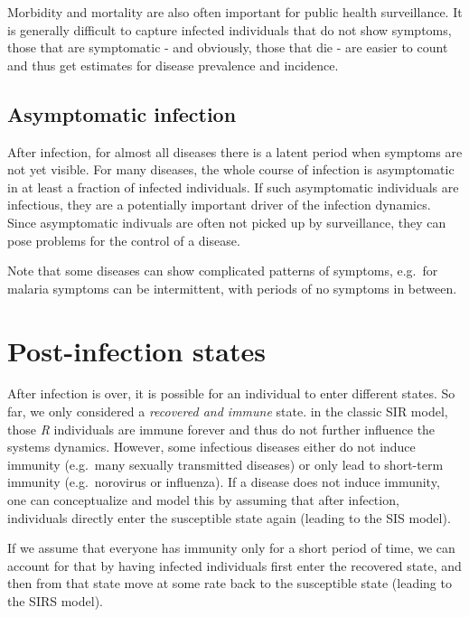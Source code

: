 \documentclass[]{book}
\theoremstyle{definition}
\theoremstyle{definition}
\theoremstyle{definition}
\theoremstyle{remark}
\begin{document}
Morbidity and mortality are also often important for public health
surveillance. It is generally difficult to capture infected individuals
that do not show symptoms, those that are symptomatic - and obviously,
those that die - are easier to count and thus get estimates for disease
prevalence and incidence.

\hypertarget{asymptomatic-infection}{%
\subsection{Asymptomatic infection}\label{asymptomatic-infection}}

After infection, for almost all diseases there is a latent period when
symptoms are not yet visible. For many diseases, the whole course of
infection is asymptomatic in at least a fraction of infected
individuals. If such asymptomatic individuals are infectious, they are a
potentially important driver of the infection dynamics. Since
asymptomatic indivuals are often not picked up by surveillance, they can
pose problems for the control of a disease.

Note that some diseases can show complicated patterns of symptoms,
e.g.~for malaria symptoms can be intermittent, with periods of no
symptoms in between.

\hypertarget{post-infection-states}{%
\section{Post-infection states}\label{post-infection-states}}

After infection is over, it is possible for an individual to enter
different states. So far, we only considered a \emph{recovered and
immune} state. in the classic SIR model, those \emph{R} individuals are
immune forever and thus do not further influence the systems dynamics.
However, some infectious diseases either do not induce immunity
(e.g.~many sexually transmitted diseases) or only lead to short-term
immunity (e.g.~norovirus or influenza). If a disease does not induce
immunity, one can conceptualize and model this by assuming that after
infection, individuals directly enter the susceptible state again
(leading to the SIS model).

If we assume that everyone has immunity only for a short period of time,
we can account for that by having infected individuals first enter the
recovered state, and then from that state move at some rate back to the
susceptible state (leading to the SIRS model).
\end{document}
